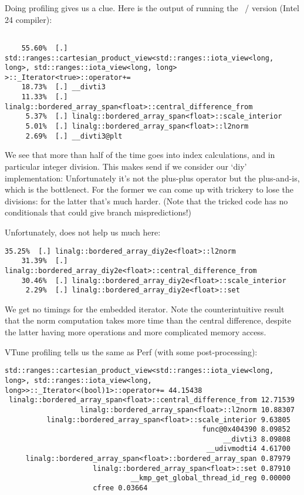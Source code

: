 Doing profiling gives us a clue.
Here is the output of running the ~/ 
version (Intel 24 compiler):
\begin{lstlisting}[language=verbatim]
%% make run_perf VARIANTS=span NSIZE=10000 ECHO=1  

    55.60%  [.] std::ranges::cartesian_product_view<std::ranges::iota_view<long, long>, std::ranges::iota_view<long, long> >::_Iterator<true>::operator+=
    18.73%  [.] __divti3
    11.33%  [.] linalg::bordered_array_span<float>::central_difference_from
     5.37%  [.] linalg::bordered_array_span<float>::scale_interior
     5.01%  [.] linalg::bordered_array_span<float>::l2norm
     2.69%  [.] __divti3@plt
\end{lstlisting}
We see that more than half of the time goes into index calculations,
and in particular integer division.
This makes send if we consider our `diy' implementation:
Unfortunately it's not the plus-plus operator but the plus-and-is,
which is the bottlenect.
For the former we can come up with trickery to lose the divisions:
for the latter that's much harder.
(Note that the tricked code has no conditionals that could give branch mispredictions!)

Unfortunately,  does not help us much here:
\begin{lstlisting}[language=verbatim]
    35.25%  [.] linalg::bordered_array_diy2e<float>::l2norm
    31.39%  [.] linalg::bordered_array_diy2e<float>::central_difference_from
    30.46%  [.] linalg::bordered_array_diy2e<float>::scale_interior
     2.29%  [.] linalg::bordered_array_diy2e<float>::set
\end{lstlisting}
We get no timings for the embedded iterator.
Note the counterintuitive result that the norm computation takes more time than the
central difference,
despite the latter having more operations
and more complicated memory access.

VTune profiling tells us the same as Perf
(with some post-processing):
\begin{lstlisting}[language=verbatim]
std::ranges::cartesian_product_view<std::ranges::iota_view<long, long>, std::ranges::iota_view<long, long>>::_Iterator<(bool)1>::operator+= 44.15438
 linalg::bordered_array_span<float>::central_difference_from 12.71539
                  linalg::bordered_array_span<float>::l2norm 10.88307
          linalg::bordered_array_span<float>::scale_interior 9.63805
                                               func@0x404390 8.09852
                                                    __divti3 8.09808
                                                __udivmodti4 4.61700
     linalg::bordered_array_span<float>::bordered_array_span 0.87979
                     linalg::bordered_array_span<float>::set 0.87910
                              __kmp_get_global_thread_id_reg 0.00000
                     cfree 0.03664
\end{lstlisting}

